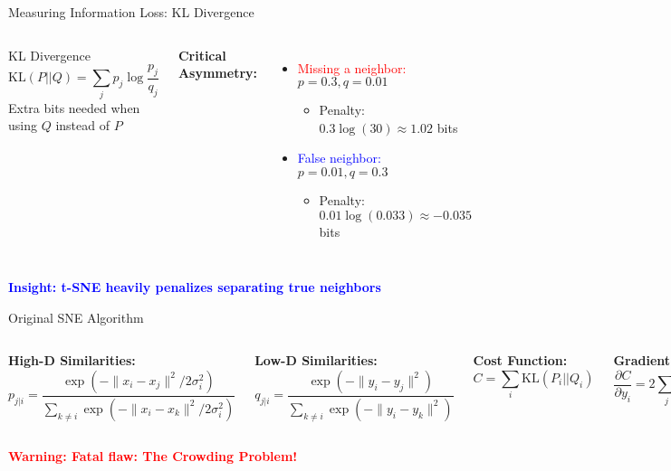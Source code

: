 \documentclass[aspectratio=169]{beamer}
\newcommand{\conceptbox}[2]{\colorbox{#1!20}{\textcolor{#1}{\textbf{#2}}}}
\newcommand{\warning}[1]{\conceptbox{red}{Warning: #1}}
\newcommand{\insight}[1]{\conceptbox{blue}{Insight: #1}}
\begin{document}
\begin{frame}{Measuring Information Loss: KL Divergence}
\begin{columns}
\begin{block}{KL Divergence}
$$\text{KL}(P||Q) = \sum_j p_j \log\frac{p_j}{q_j}$$
Extra bits needed when using $Q$ instead of $P$
\end{block}

\textbf{Critical Asymmetry:}
\begin{itemize}
\item \textcolor{red}{Missing a neighbor:} $p=0.3, q=0.01$
    \begin{itemize}
    \item Penalty: $0.3 \log(30) \approx 1.02$ bits
    \end{itemize}
\item \textcolor{blue}{False neighbor:} $p=0.01, q=0.3$
    \begin{itemize}
    \item Penalty: $0.01 \log(0.033) \approx -0.035$ bits
    \end{itemize}
\end{itemize}

\begin{center}
\end{center}
\end{columns}

\vspace{0.3cm}
\insight{t-SNE heavily penalizes separating true neighbors}
\end{frame}

\begin{frame}{Original SNE Algorithm}
\begin{columns}
\textbf{High-D Similarities:}
$$p_{j|i} = \frac{\exp(-\|x_i-x_j\|^2/2\sigma_i^2)}{\sum_{k \neq i}\exp(-\|x_i-x_k\|^2/2\sigma_i^2)}$$

\textbf{Low-D Similarities:}
$$q_{j|i} = \frac{\exp(-\|y_i-y_j\|^2)}{\sum_{k \neq i}\exp(-\|y_i-y_k\|^2)}$$

\textbf{Cost Function:}
$$C = \sum_i \text{KL}(P_i||Q_i)$$

\textbf{Gradient:}
$$\frac{\partial C}{\partial y_i} = 2\sum_j (p_{j|i} - q_{j|i} + p_{i|j} - q_{i|j})(y_i - y_j)$$
\end{columns}

\vspace{0.3cm}
\warning{Fatal flaw: The Crowding Problem!}
\end{frame}
\end{document}
